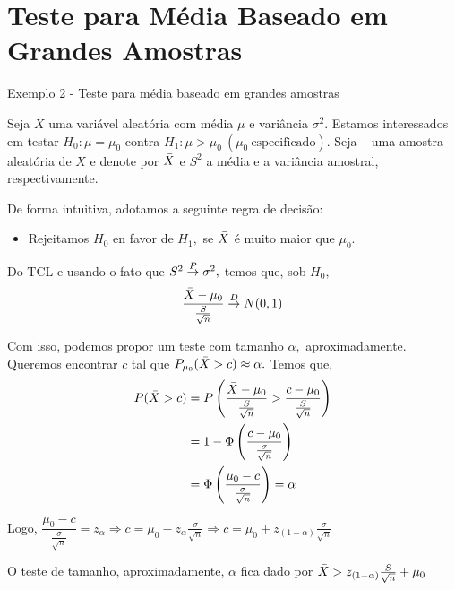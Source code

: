 \documentclass[12pt]{beamer}
\begin{document}
\section{Teste para Média Baseado em Grandes Amostras}
\begin{frame}{Exemplo 2 - Teste para média baseado em grandes amostras}
\begin{block}{}
\justifying
Seja $X$ uma variável aleatória com média $\mu$ e variância $\sigma^{2}.$ Estamos interessados em testar $H_{0}:\mu=\mu_{0}$ contra $H_{1}:\mu>\mu_{0}~(\mu_{0}~\text{especificado}).$ Seja \seqX~ uma amostra aleatória de $X$ e denote por $\Bar{X}$ e $S^{2}$ a média e a variância amostral, respectivamente.
\end{block}
\pause
\begin{block}{}
\justifying
De forma intuitiva, adotamos a seguinte regra de decisão:
\begin{itemize}
    \item Rejeitamos $H_{0}$ en favor de $H_{1},$ se $\Bar{X}$ é muito maior que $\mu_{0}.$
\end{itemize}
\end{block}
\end{frame}

\begin{frame}{}
\begin{block}{}
\justifying
Do TCL e usando o fato que $S^{2}\overset{P}{\rightarrow} \sigma^{2},$ temos que, sob $H_{0},$ \[\dfrac{\Bar{X}-\mu_{0}}{\frac{S}{\sqrt{n}}}\overset{D}{\rightarrow} N(0,1)\]
\end{block}
\pause
\begin{block}{}
\justifying
Com isso, podemos propor um teste com tamanho $\alpha,$ aproximadamente. Queremos encontrar $c$ tal que $P_{\mu_{0}}(\Bar{X}>c)\approx\alpha.$ Temos que,
\begin{align*}
    P(\Bar{X}>c)&=P\left(\dfrac{\Bar{X}-\mu_{0}}{\frac{S}{\sqrt{n}}}>\dfrac{c-\mu_{0}}{\frac{S}{\sqrt{n}}}\right)\\
    &=1-\Phi\left(\frac{c-\mu_{0}}{\frac{\sigma}{\sqrt{n}}}\right)\\
    &=\Phi\left(\frac{\mu_{0}-c}{\frac{\sigma}{\sqrt{n}}}\right)=\alpha
\end{align*}
\end{block}
\end{frame}

\begin{frame}{}
\begin{block}{}
\justifying
Logo, $\dfrac{\mu_{0}-c}{\frac{\sigma}{\sqrt{n}}}=z_{\alpha}\Rightarrow c=\mu_{0}-z_{\alpha}\frac{\sigma}{\sqrt{n}}\Rightarrow c=\mu_{0}+z_{(1-\alpha)}\frac{\sigma}{\sqrt{n}}$
\end{block}
\pause
\begin{block}{}
\justifying
O teste de tamanho, aproximadamente, $\alpha$ fica dado por $\Bar{X}>z_{(1-\alpha)}\frac{S}{\sqrt{n}}+\mu_{0}$
\end{block}
\end{frame}
\end{document}
